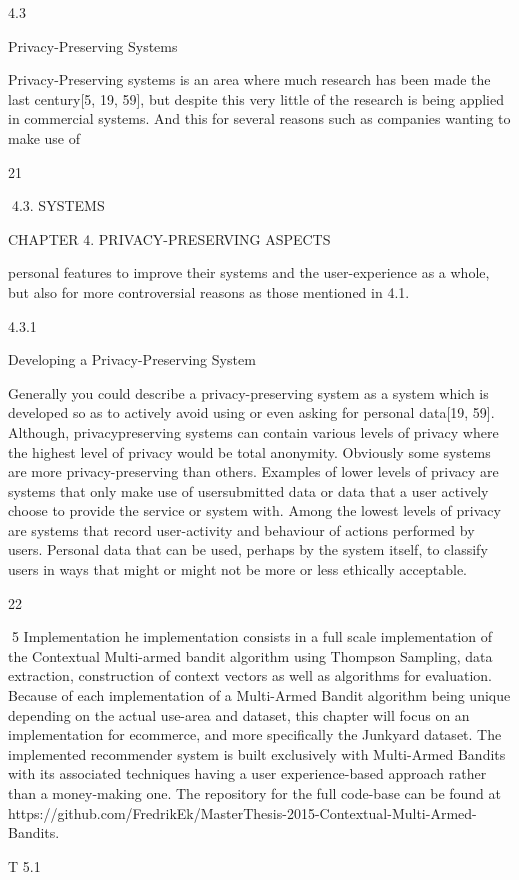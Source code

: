 4.3

Privacy-Preserving Systems

Privacy-Preserving systems is an area where much research has been made the last
century[5, 19, 59], but despite this very little of the research is being applied in commercial systems. And this for several reasons such as companies wanting to make use of

21

4.3. SYSTEMS

CHAPTER 4. PRIVACY-PRESERVING ASPECTS

personal features to improve their systems and the user-experience as a whole, but also
for more controversial reasons as those mentioned in 4.1.

4.3.1

Developing a Privacy-Preserving System

Generally you could describe a privacy-preserving system as a system which is developed
so as to actively avoid using or even asking for personal data[19, 59]. Although, privacypreserving systems can contain various levels of privacy where the highest level of privacy
would be total anonymity. Obviously some systems are more privacy-preserving than
others. Examples of lower levels of privacy are systems that only make use of usersubmitted data or data that a user actively choose to provide the service or system
with. Among the lowest levels of privacy are systems that record user-activity and behaviour of actions performed by users. Personal data that can be used, perhaps by
the system itself, to classify users in ways that might or might not be more or less
ethically acceptable.

22

5
Implementation
he implementation consists in a full scale implementation of the Contextual
Multi-armed bandit algorithm using Thompson Sampling, data extraction,
construction of context vectors as well as algorithms for evaluation. Because of
each implementation of a Multi-Armed Bandit algorithm being unique depending on the actual use-area and dataset, this chapter will focus on an implementation for ecommerce, and more specifically the Junkyard dataset. The implemented recommender
system is built exclusively with Multi-Armed Bandits with its associated techniques
having a user experience-based approach rather than a money-making one. The repository for the full code-base can be found at https://github.com/FredrikEk/MasterThesis-2015-Contextual-Multi-Armed-Bandits.

T
5.1

